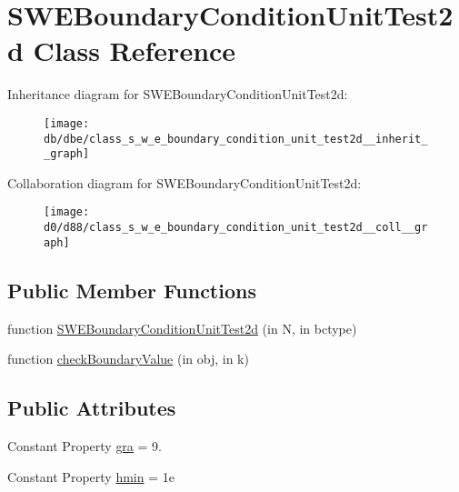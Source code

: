 \hypertarget{class_s_w_e_boundary_condition_unit_test2d}{}\section{S\+W\+E\+Boundary\+Condition\+Unit\+Test2d Class Reference}
\label{class_s_w_e_boundary_condition_unit_test2d}


Inheritance diagram for S\+W\+E\+Boundary\+Condition\+Unit\+Test2d\+:
\nopagebreak
\begin{figure}[H]
\begin{center}
\leavevmode
\texttt{[image: db/dbe/class\_s\_w\_e\_boundary\_condition\_unit\_test2d\_\_inherit\_\_graph]}
\end{center}
\end{figure}


Collaboration diagram for S\+W\+E\+Boundary\+Condition\+Unit\+Test2d\+:
\nopagebreak
\begin{figure}[H]
\begin{center}
\leavevmode
\texttt{[image: d0/d88/class\_s\_w\_e\_boundary\_condition\_unit\_test2d\_\_coll\_\_graph]}
\end{center}
\end{figure}
\subsection*{Public Member Functions}
\begin{DoxyCompactItemize}
\item 
function \hyperlink{class_s_w_e_boundary_condition_unit_test2d_a08448218e450dd02837eb84f008f0923}{S\+W\+E\+Boundary\+Condition\+Unit\+Test2d} (in N, in bctype)
\item 
function \hyperlink{class_s_w_e_boundary_condition_unit_test2d_a54f73b68d5c886228de723c4988c7b1e}{check\+Boundary\+Value} (in obj, in k)
\end{DoxyCompactItemize}
\subsection*{Public Attributes}
\begin{DoxyCompactItemize}
\item 
Constant Property \hyperlink{class_s_w_e_boundary_condition_unit_test2d_a749f952453e284c14bdc0357c4907795}{gra} = 9.
\item 
Constant Property \hyperlink{class_s_w_e_boundary_condition_unit_test2d_a298fc87be8f78731362ed7657d13cec5}{hmin} = 1e
\end{DoxyCompactItemize}

